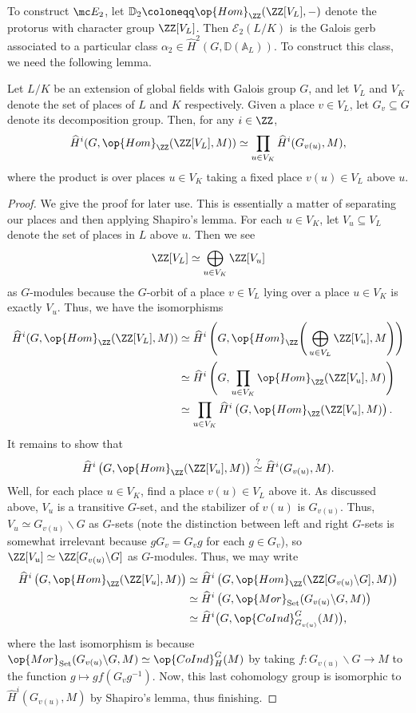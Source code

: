 To construct $\mc E_2$, let $\mathbb D_2\coloneqq\op{Hom}_\ZZ(\ZZ[V_L],-)$ denote the protorus with character group $\ZZ[V_L]$. Then $\mathcal E_2(L/K)$ is the Galois gerb associated to a particular class $\alpha_2\in\widehat H^2\left(G,\mathbb D(\mathbb A_L)\right)$. To construct this class, we need the following lemma.
\begin{lemma} \label{lem:magicaltate}
	Let $L/K$ be an extension of global fields with Galois group $G$, and let $V_L$ and $V_K$ denote the set of places of $L$ and $K$ respectively. Given a place $v\in V_L$, let $G_v\subseteq G$ denote its decomposition group. Then, for any $i\in\ZZ$,
	\[\widehat H^i(G,\op{Hom}_\ZZ(\ZZ[V_L],M))\simeq\prod_{u\in V_K}\widehat H^i(G_{v(u)},M),\]
	where the product is over places $u\in V_K$ taking a fixed place $v(u)\in V_L$ above $u$.
\end{lemma}
\begin{proof}
	We give the proof for later use. This is essentially a matter of separating our places and then applying Shapiro's lemma. For each $u\in V_K$, let $V_{u}\subseteq V_L$ denote the set of places in $L$ above $u$. Then we see
	\[\ZZ[V_L]\simeq\bigoplus_{u\in V_K}\ZZ[V_u]\]
	as $G$-modules because the $G$-orbit of a place $v\in V_L$ lying over a place $u\in V_K$ is exactly $V_u$. Thus, we have the isomorphisms
	\begin{align*}
		\widehat H^i(G,\op{Hom}_\ZZ(\ZZ[V_L],M)) &\simeq \widehat H^i\left(G,\op{Hom}_\ZZ\Bigg(\bigoplus_{u\in V_L}\ZZ[V_u],M\Bigg)\right) \\
		&\simeq \widehat H^i\left(G,\prod_{u\in V_K}\op{Hom}_\ZZ(\ZZ[V_u],M)\right) \\
		&\simeq \prod_{u\in V_K}\widehat H^i\left(G,\op{Hom}_\ZZ(\ZZ[V_u],M)\right).
	\end{align*}
	It remains to show that
	\[\widehat H^i\left(G,\op{Hom}_\ZZ(\ZZ[V_u],M)\right)\stackrel?\simeq\widehat H^i(G_{v(u)},M).\]
	Well, for each place $u\in V_K$, find a place $v(u)\in V_L$ above it. As discussed above, $V_u$ is a transitive $G$-set, and the stabilizer of $v(u)$ is $G_{v(u)}$. Thus, $V_u\simeq G_{v(u)}\backslash G$ as $G$-sets (note the distinction between left and right $G$-sets is somewhat irrelevant because $gG_v=G_vg$ for each $g\in G_v$), so $\ZZ[V_u]\simeq\ZZ[G_{v(u)}\backslash G]$ as $G$-modules. Thus, we may write
	\begin{align*}
		\widehat H^i\left(G,\op{Hom}_\ZZ(\ZZ[V_u],M)\right) &\simeq \widehat H^i\left(G,\op{Hom}_\ZZ(\ZZ[G_{v(u)}\backslash G],M)\right) \\
		&\simeq \widehat H^i\left(G,\op{Mor}_{\mathrm{Set}}(G_{v(u)}\backslash G,M)\right) \\
		&\simeq \widehat H^i\big(G,\op{CoInd}_{G_{v(u)}}^G(M)\big),
	\end{align*}
	where the last isomorphism is because $\op{Mor}_{\mathrm{Set}}(G_{v(u)}\backslash G,M)\simeq\op{CoInd}_H^G(M)$ by taking $f\colon G_{v(u)}\backslash G\to M$ to the function $g\mapsto gf\left(G_vg^{-1}\right)$. Now, this last cohomology group is isomorphic to $\widehat H^i(G_{v(u)},M)$ by Shapiro's lemma, thus finishing.
\end{proof}
